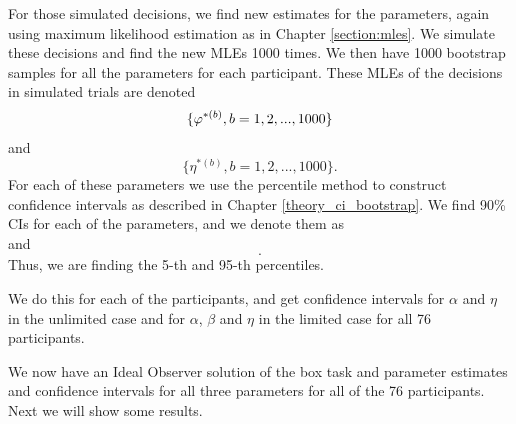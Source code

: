 For those simulated decisions, we find new estimates for the parameters, again using maximum likelihood estimation as in Chapter \ref{section:mles}. We simulate these decisions and find the new MLEs 1000 times. We then have 1000 bootstrap samples for all the parameters for each participant. These MLEs of the decisions in simulated trials are denoted
\begin{equation*}
    \{\varphi^{*(b)}, b=1,2,...,1000 \}
\end{equation*}
and 
\begin{equation*}
    \{\eta^{*(b)}, b=1,2,...,1000 \}.
\end{equation*}
For each of these parameters we use the percentile method to construct confidence intervals as described in Chapter \ref{theory_ci_bootstrap}. We find 90\% CIs for each of the parameters, and we denote them as
\begin{equation*}
    [\hat{\vp}^{*(5)}_{1000},\hat{\vp}^{*(95)}_{1000}]
\end{equation*}
and
\begin{equation*}
    [\hat{\eta}^{*(5)}_{1000},\hat{\eta}^{*(95)}_{1000}].
\end{equation*}
Thus, we are finding the 5-th and 95-th percentiles. 

We do this for each of the participants, and get confidence intervals for $\alpha$ and $\eta$ in the unlimited case and for $\alpha$, $\beta$ and $\eta$ in the limited case for all 76 participants. 

We now have an Ideal Observer solution of the box task and parameter estimates and confidence intervals for all three parameters for all of the 76 participants. Next we will show some results.